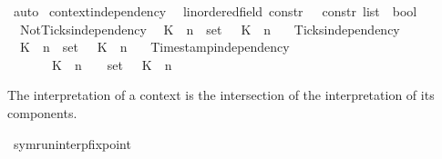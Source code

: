 \begin{isabellebody}
\ auto\isanewline
\isanewline
%
%
\endisatagproof
{\isafoldproof}%
%
\isadelimproof
\isanewline
%
\endisadelimproof
{}\isamarkupfalse%
\ context{\isacharunderscore}independency\isanewline
\ \ {\isacharcolon}{\isacharcolon}{\isacartoucheopen}{\isacharparenleft}{\isacharprime}{\isasymtau}{\isacharcolon}{\isacharcolon}linordered{\isacharunderscore}field{\isacharparenright}\ constr\ {\isasymRightarrow}\ {\isacharprime}{\isasymtau}\ constr\ list\ {\isasymRightarrow}\ bool{\isacartoucheclose}\ {\isacharparenleft}{\isacartoucheopen}{\isacharunderscore}\ {\isasymbowtie}\ {\isacharunderscore}{\isacartoucheclose}{\isacharparenright}\isanewline
{}\isanewline
\ \ NotTicks{\isacharunderscore}independency{\isacharcolon}\isanewline
\ \ {\isacartoucheopen}{\isacharparenleft}K\ {\isasymUp}\ n{\isacharparenright}\ {\isasymnotin}\ set\ {\isasymGamma}\ {\isasymLongrightarrow}\ {\isacharparenleft}K\ {\isasymnot}{\isasymUp}\ n{\isacharparenright}\ {\isasymbowtie}\ {\isasymGamma}{\isacartoucheclose}\isanewline
{\isacharbar}\ Ticks{\isacharunderscore}independency{\isacharcolon}\isanewline
\ \ {\isacartoucheopen}{\isacharparenleft}K\ {\isasymnot}{\isasymUp}\ n{\isacharparenright}\ {\isasymnotin}\ set\ {\isasymGamma}\ {\isasymLongrightarrow}\ {\isacharparenleft}K\ {\isasymUp}\ n{\isacharparenright}\ {\isasymbowtie}\ {\isasymGamma}{\isacartoucheclose}\isanewline
{\isacharbar}\ Timestamp{\isacharunderscore}independency{\isacharcolon}\isanewline
\ \ {\isacartoucheopen}{\isacharparenleft}{\isasymnexists}{\isasymtau}{\isacharprime}{\isachardot}\ {\isasymtau}{\isacharprime}\ {\isacharequal}\ {\isasymtau}\ {\isasymand}\ {\isacharparenleft}K\ {\isasymDown}\ n\ {\isacharat}\ {\isasymtau}{\isacharparenright}\ {\isasymin}\ set\ {\isasymGamma}{\isacharparenright}\ {\isasymLongrightarrow}\ {\isacharparenleft}K\ {\isasymDown}\ n\ {\isacharat}\ {\isasymtau}{\isacharparenright}\ {\isasymbowtie}\ {\isasymGamma}{\isacartoucheclose}%
\isadelimdocument
%
\endisadelimdocument
%
\isatagdocument
%
\isamarkuptrue%
%
\isamarkuptrue%
%
\endisatagdocument
{\isafolddocument}%
%
\isadelimdocument
%
\endisadelimdocument
%
\begin{isamarkuptext}%
The interpretation of a context is the intersection of the interpretation 
  of its components.%
\end{isamarkuptext}\isamarkuptrue%
\isamarkupfalse%
\ symrun{\isacharunderscore}interp{\isacharunderscore}fixpoint{\isacharcolon}\isanewline

\end{isabellebody}
